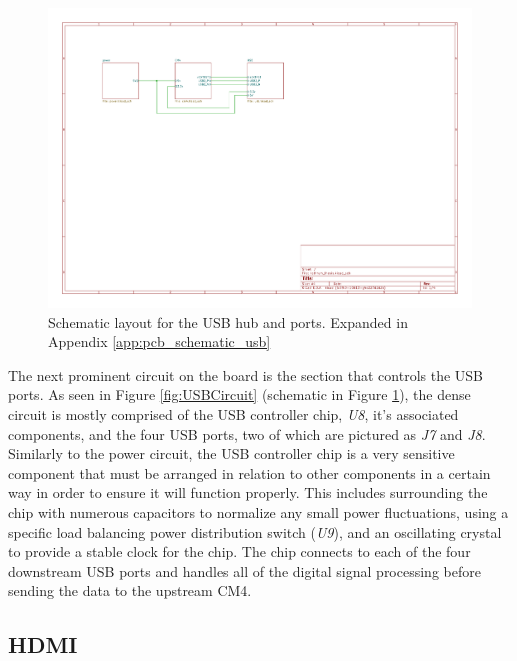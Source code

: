 \begin{figure}[b!]
  \centering
  \includegraphics[width=.75\textwidth,page=4]{Figures/kicad/lathrum_thesis_schematic.pdf}
  \caption[USB Schematic]{Schematic layout for the USB hub and ports. Expanded in Appendix \ref{app:pcb_schematic_usb}}
  \label{fig:pcb_schematic_usb}
\end{figure}

The next prominent circuit on the board is the section that controls the USB ports.
As seen in Figure \ref{fig:USBCircuit} (schematic in Figure \ref{fig:pcb_schematic_usb}), the dense circuit is mostly comprised of the USB controller chip, \emph{U8}, it's associated components, and the four USB ports, two of which are pictured as \emph{J7} and \emph{J8}.
Similarly to the power circuit, the USB controller chip is a very sensitive component that must be arranged in relation to other components in a certain way in order to ensure it will function properly.
This includes surrounding the chip with numerous capacitors to normalize any small power fluctuations, using a specific load balancing power distribution switch (\emph{U9}), and an oscillating crystal to provide a stable clock for the chip.
The chip connects to each of the four downstream USB ports and handles all of the digital signal processing before sending the data to the upstream CM4.

\subsection{HDMI}\label{subsec:DesigningHDMI}

